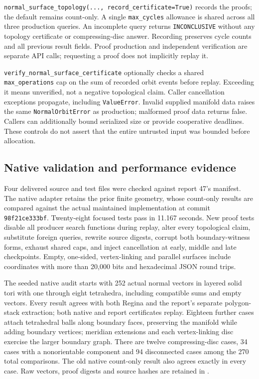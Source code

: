 \texttt{normal\_surface\_topology(..., record\_certificate=True)} records the
proofs; the default remains count-only. A single \texttt{max\_cycles}
allowance is shared across all three production queries. An incomplete
query returns \texttt{INCONCLUSIVE} without any topology certificate or
compressing-disc answer. Recording preserves cycle counts and all previous
result fields. Proof production and independent verification are separate
API calls; requesting a proof does not implicitly replay it.

\texttt{verify\_normal\_surface\_certificate} optionally checks a shared
\texttt{max\_operations} cap on the sum of recorded orbit events before
replay. Exceeding it means unverified, not a negative topological claim.
Caller cancellation exceptions propagate, including \texttt{ValueError}.
Invalid supplied manifold data raises the same \texttt{NormalOrbitError}
as production; malformed proof data returns false. Callers can additionally
bound serialized size or provide cooperative deadlines. These controls do
not assert that the entire untrusted input was bounded before allocation.

\subsection{Native validation and performance evidence}

Four delivered source and test files were checked against report 47's
manifest. The native adapter retains the prior finite geometry, whose
count-only results are compared against the actual maintained implementation
at commit \texttt{98f21ce333bf}. Twenty-eight focused tests pass in
11.167 seconds. New proof tests disable all producer search functions during
replay, alter every topological claim, substitute foreign queries, rewrite
source digests, corrupt both boundary-witness forms, exhaust shared caps,
and inject cancellation at early, middle and late checkpoints. Empty,
one-sided, vertex-linking and parallel surfaces include coordinates with
more than 20,000 bits and hexadecimal JSON round trips.

The seeded native audit starts with 252 actual normal vectors in layered solid
tori with one through eight tetrahedra, including compatible sums and empty
vectors. Every result agrees with both Regina and the report's separate
polygon-stack extraction; both native and report certificates replay.
Eighteen further cases attach tetrahedral balls along boundary faces, preserving
the manifold while adding boundary vertices; meridian extensions and each
vertex-linking disc exercise the larger boundary graph. There are twelve
compressing-disc cases, 34 cases with a nonorientable
component and 94 disconnected cases among the 270 total comparisons. The old native count-only result also
agrees exactly in every case. Raw vectors, proof digests and source hashes
are retained in .

